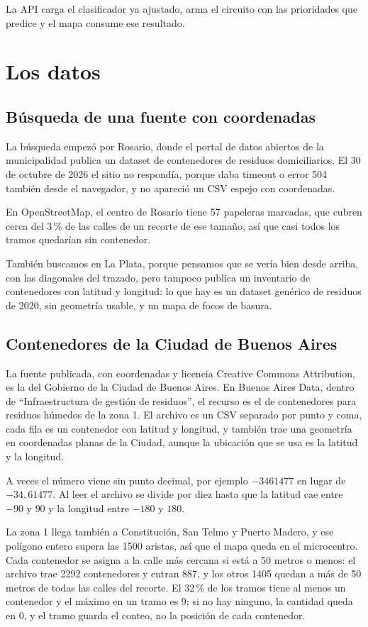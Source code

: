 \documentclass[12pt,a4paper]{report}
\begin{document}
La API carga el clasificador ya ajustado, arma el circuito con las prioridades que predice y el mapa consume ese resultado.

\chapter{Los datos}

\section{Búsqueda de una fuente con coordenadas}

La búsqueda empezó por Rosario, donde el portal de datos abiertos de la municipalidad publica un dataset de contenedores de residuos domiciliarios. El 30 de octubre de 2026 el sitio no respondía, porque daba timeout o error 504 también desde el navegador, y no apareció un CSV espejo con coordenadas.

En OpenStreetMap, el centro de Rosario tiene 57 papeleras marcadas, que cubren cerca del 3\,\% de las calles de un recorte de ese tamaño, así que casi todos los tramos quedarían sin contenedor.

También buscamos en La Plata, porque pensamos que se vería bien desde arriba, con las diagonales del trazado, pero tampoco publica un inventario de contenedores con latitud y longitud: lo que hay es un dataset genérico de residuos de 2020, sin geometría usable, y un mapa de focos de basura.

\section{Contenedores de la Ciudad de Buenos Aires}

La fuente publicada, con coordenadas y licencia Creative Commons Attribution, es la del Gobierno de la Ciudad de Buenos Aires. En Buenos Aires Data, dentro de ``Infraestructura de gestión de residuos'', el recurso es el de contenedores para residuos húmedos de la zona 1. El archivo es un CSV separado por punto y coma, cada fila es un contenedor con latitud y longitud, y también trae una geometría en coordenadas planas de la Ciudad, aunque la ubicación que se usa es la latitud y la longitud.

A veces el número viene sin punto decimal, por ejemplo $-3461477$ en lugar de $-34{,}61477$. Al leer el archivo se divide por diez hasta que la latitud cae entre $-90$ y $90$ y la longitud entre $-180$ y $180$.

La zona 1 llega también a Constitución, San Telmo y Puerto Madero, y ese polígono entero supera las 1500 aristas, así que el mapa queda en el microcentro. Cada contenedor se asigna a la calle más cercana si está a 50 metros o menos: el archivo trae 2292 contenedores y entran 887, y los otros 1405 quedan a más de 50 metros de todas las calles del recorte. El 32\,\% de los tramos tiene al menos un contenedor y el máximo en un tramo es 9; si no hay ninguno, la cantidad queda en 0, y el tramo guarda el conteo, no la posición de cada contenedor.
\end{document}
